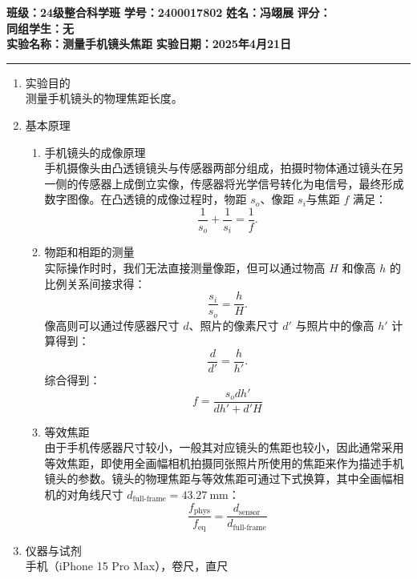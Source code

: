 \documentclass[a4paper]{article}
\begin{document}
\noindent\textbf{班级：24级整合科学班} \hspace{1cm} \textbf{学号：2400017802} \hspace{1cm} \textbf{姓名：冯翊展} \hspace{1cm} \textbf{评分：}\\
\textbf{同组学生：无} \\
\textbf{实验名称：测量手机镜头焦距}   \hfill \textbf{实验日期：2025年4月21日} 

\hrule
\vspace{3mm}

\begin{enumerate}[label=\chinese*.,left=0pt]
    \item 实验目的
    \\
    测量手机镜头的物理焦距长度。

    \item 基本原理
        \begin{enumerate}[label=\arabic*.,left=0pt]
            \item 手机镜头的成像原理
            \\
            手机摄像头由凸透镜镜头与传感器两部分组成，拍摄时物体通过镜头在另一侧的传感器上成倒立实像，传感器将光学信号转化为电信号，最终形成数字图像。在凸透镜的成像过程时，物距 $s_o$、像距 $s_i$与焦距 $f$ 满足：
            $$\frac{1}{s_o}+\frac{1}{s_i}= \frac{1}{f}.$$

            \item 物距和相距的测量
            \\
            实际操作时时，我们无法直接测量像距，但可以通过物高 $H$ 和像高 $h$ 的比例关系间接求得：
            $$\frac{s_i}{s_o} = \frac{h}{H}.$$
            像高则可以通过传感器尺寸 $d$、照片的像素尺寸 $d'$ 与照片中的像高 $h'$ 计算得到：
            $$\frac{d}{d'} = \frac{h}{h'}.$$
            综合得到：
            $$f = \frac{s_odh'}{dh'+d'H}$$

            \item 等效焦距
            \\
            由于手机传感器尺寸较小，一般其对应镜头的焦距也较小，因此通常采用等效焦距，即使用全画幅相机拍摄同张照片所使用的焦距来作为描述手机镜头的参数。镜头的物理焦距与等效焦距可通过下式换算，其中全画幅相机的对角线尺寸 $d_\text{full-frame}=\qty{43.27}{\mm}$：
            $$\frac{f_{\text{phys}}}{f_{\text{eq}}} = \frac{d_{\text{sensor}}}{d_{\text{full-frame}}}$$
        \end{enumerate}
    \item 仪器与试剂
    \\
    手机（iPhone 15 Pro Max），卷尺，直尺


\end{enumerate}
\end{document}

